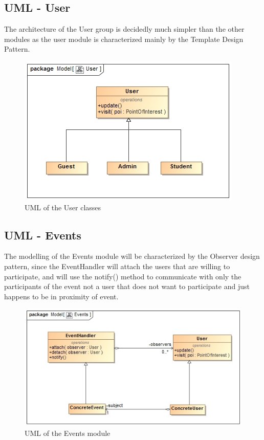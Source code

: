 \documentclass[12pt,a4paper]{article}
\begin{document}
	\subsection{UML - User}
	The architecture of the User group is decidedly much simpler than the other modules as the user module is characterized mainly by the Template Design Pattern.
	\begin{figure}
		\includegraphics[width=\linewidth]{Images/User.jpg}
		\caption{UML of the User classes}
	\end{figure}
	
	\subsection{UML - Events}
	The modelling of the Events module will be characterized by the Observer design pattern, since the EventHandler will attach the users that are willing to participate, and will use the notify() method to communicate with only the participants of the event not a user that does not want to participate and just happens to be in proximity of event.
	\begin{figure}
		\includegraphics[width=\linewidth]{Images/Events.jpg}
		\caption{UML of the Events module}
	\end{figure}
	
\end{document}

